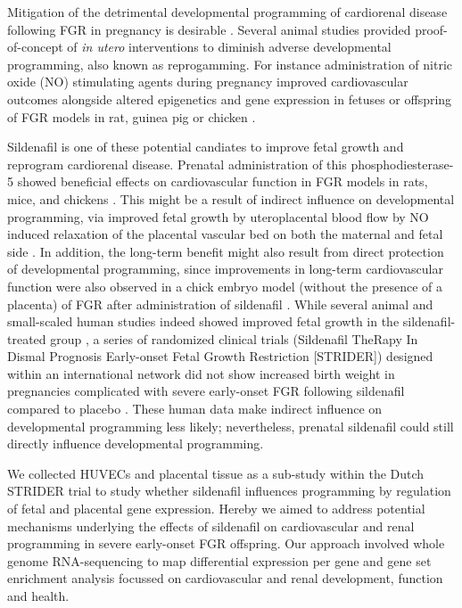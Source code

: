 \documentclass[authordate, empirical]{jote-new-article}
\begin{document}
	Mitigation of the detrimental developmental programming of cardiorenal disease following FGR in pregnancy is desirable \parencites{Paauw2016}. Several animal studies provided proof-of-concept of \emph{in utero }interventions to diminish adverse developmental programming, also known as reprogamming. For instance administration of nitric oxide (NO) stimulating agents during pregnancy improved cardiovascular outcomes alongside altered epigenetics and gene expression in fetuses or offspring of FGR models in rat, guinea pig or chicken \parencites{Herrera2017}{Itani2017}{Man2020}{Wu2015}.



	Sildenafil is one of these potential candiates to improve fetal growth and reprogram cardiorenal disease. Prenatal administration of this phosphodiesterase-5 showed beneficial effects on cardiovascular function in FGR models in rats, mice, and chickens \parencites{Itani2017}{Mills2018}{Terstappen2019}. This might be a result of indirect influence on developmental programming, via improved fetal growth by uteroplacental blood flow by NO induced relaxation of the placental vascular bed on both the maternal and fetal side \parencites{Krause2011}{Wareing2006}. In addition, the long-term benefit might also result from direct protection of developmental programming, since improvements in long-term cardiovascular function were also observed in a chick embryo model (without the presence of a placenta) of FGR after administration of sildenafil \parencites{Itani2017}. While several animal and small-scaled human studies indeed showed improved fetal growth in the sildenafil-treated group \parencites{Paauw2017}{VonDadelszen2011}, a series of randomized clinical trials (Sildenafil TheRapy In Dismal Prognosis Early-onset Fetal Growth Restriction [STRIDER]) designed within an international network did not show increased birth weight in pregnancies complicated with severe early-onset FGR following sildenafil compared to placebo \parencites{Pels2020}{Sharp2018}{Groom2019}. These human data make indirect influence on developmental programming less likely; nevertheless, prenatal sildenafil could still directly influence developmental programming.



	We collected HUVECs and placental tissue as a sub-study within the Dutch STRIDER trial to study whether sildenafil influences programming by regulation of fetal and placental gene expression. Hereby we aimed to address potential mechanisms underlying the effects of sildenafil on cardiovascular and renal programming in severe early-onset FGR offspring. Our approach involved whole genome RNA-sequencing to map differential expression per gene and gene set enrichment analysis focussed on cardiovascular and renal development, function and health.
\end{document}
